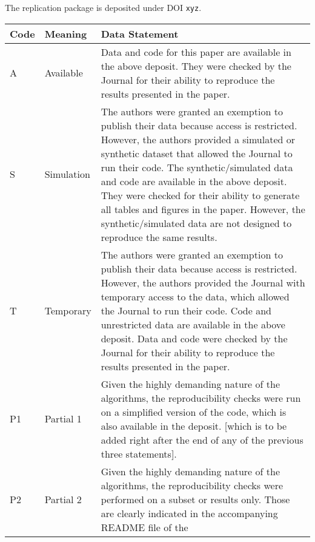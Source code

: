 \documentclass[
  letterpaper,
  DIV=11,
  numbers=noendperiod]{scrartcl}
\author{}
\date{}
\begin{document}
The replication package is deposited under DOI \texttt{xyz}.

\begin{longtable}[]{@{}
  >{\centering\arraybackslash}p{}
  >{\centering\arraybackslash}p{}
  >{\raggedright\arraybackslash}p{}@{}}
\toprule\noalign{}
\begin{minipage}[b]{\linewidth}\centering
Code
\end{minipage} & \begin{minipage}[b]{\linewidth}\centering
Meaning
\end{minipage} & \begin{minipage}[b]{\linewidth}\raggedright
Data Statement
\end{minipage} \\
\midrule\noalign{}
\endhead
\bottomrule\noalign{}
\endlastfoot
A & Available & Data and code for this paper are available in the above
deposit. They were checked by the Journal for their ability to reproduce
the results presented in the paper. \\
S & Simulation & The authors were granted an exemption to publish their
data because access is restricted. However, the authors provided a
simulated or synthetic dataset that allowed the Journal to run their
code. The synthetic/simulated data and code are available in the above
deposit. They were checked for their ability to generate all tables and
figures in the paper. However, the synthetic/simulated data are not
designed to reproduce the same results. \\
T & Temporary & The authors were granted an exemption to publish their
data because access is restricted. However, the authors provided the
Journal with temporary access to the data, which allowed the Journal to
run their code. Code and unrestricted data are available in the above
deposit. Data and code were checked by the Journal for their ability to
reproduce the results presented in the paper. \\
P1 & Partial 1 & Given the highly demanding nature of the algorithms,
the reproducibility checks were run on a simplified version of the code,
which is also available in the deposit. {[}which is to be added right
after the end of any of the previous three statements{]}. \\
P2 & Partial 2 & Given the highly demanding nature of the algorithms,
the reproducibility checks were performed on a subset or results only.
Those are clearly indicated in the accompanying README file of the

\end{longtable}
\end{document}
